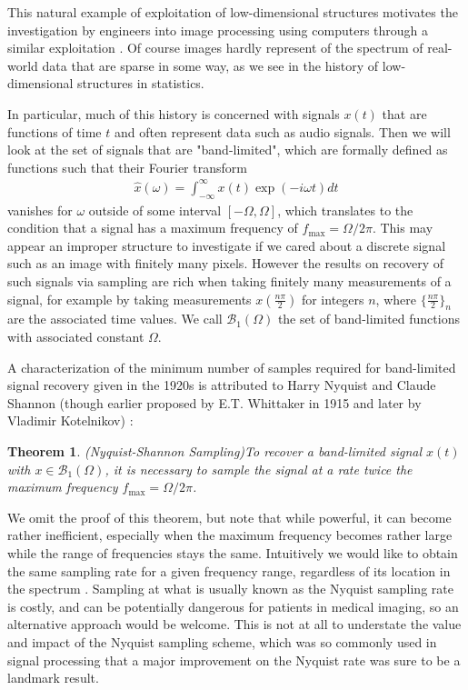 \documentclass[12pt,a4paper]{amsart}
\numberwithin{equation}{section}
\theoremstyle{plain}
\newtheorem{Th}{Theorem}[section]
\theoremstyle{definition}
\begin{document}
This natural example of exploitation of low-dimensional structures motivates the investigation by engineers into image processing using computers through a similar exploitation \cite{wm}. Of course images hardly represent of the spectrum of real-world data that are sparse in some way, as we see in the history of low-dimensional structures in statistics. 

In particular, much of this history is concerned with signals $x(t)$ that are functions of time $t$ and often represent data such as audio signals. Then we will look at the set of signals that are "band-limited", which are formally defined as functions such that their Fourier transform
\begin{align*}
    \hat x(\omega)=\int_{-\infty}^\infty x(t)\exp(-i\omega t)dt
\end{align*}
vanishes for $\omega$ outside of some interval $[-\Omega,\Omega]$, which translates to the condition that a signal has a maximum frequency of $f_{\max}=\Omega/2\pi$. This may appear an improper structure to investigate if we cared about a discrete signal such as an image with finitely many pixels. However the results on recovery of such signals via sampling are rich when taking finitely many measurements of a signal, for example by taking measurements $x(\frac{n\pi}{2})$ for integers $n$, where $\{\frac{n\pi}{2}\}_n$ are the associated time values. We call $\mathcal{B}_1(\Omega)$ the set of band-limited functions with associated constant $\Omega$.

A characterization of the minimum number of samples required for band-limited signal recovery given in the 1920s is attributed to Harry Nyquist and Claude Shannon (though earlier proposed by E.T. Whittaker in 1915 and later by Vladimir Kotelnikov) \cite{wm}:

\begin{Th}{(Nyquist-Shannon Sampling)}\label{n-s}  To recover a band-limited signal $x(t)$ with $x\in\mathcal{B}_1(\Omega)$, it is necessary to sample the signal at a rate twice the maximum frequency $f_{\max}=\Omega/2\pi$.

\end{Th}

We omit the proof of this theorem, but note that while powerful, it can become rather inefficient, especially when the maximum frequency becomes rather large while the range of frequencies stays the same. Intuitively we would like to obtain the same sampling rate for a given frequency range, regardless of its location in the spectrum \cite{wm}. Sampling at what is usually known as the Nyquist sampling rate is costly, and can be potentially dangerous for patients in medical imaging, so an alternative approach would be welcome. This is not at all to understate the value and impact of the Nyquist sampling scheme, which was so commonly used in signal processing that a major improvement on the Nyquist rate was sure to be a landmark result.
\end{document}
